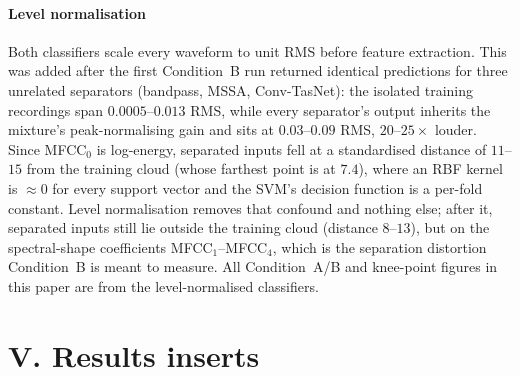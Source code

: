 \documentclass[conference]{IEEEtran}
\begin{document}
\paragraph{Level normalisation}
Both classifiers scale every waveform to unit RMS before feature extraction. This was added after the first Condition~B run returned identical predictions for three unrelated separators (bandpass, MSSA, Conv-TasNet): the isolated training recordings span $0.0005$--$0.013$ RMS, while every separator's output inherits the mixture's peak-normalising gain and sits at $0.03$--$0.09$ RMS, $20$--$25\times$ louder. Since MFCC$_0$ is log-energy, separated inputs fell at a standardised distance of $11$--$15$ from the training cloud (whose farthest point is at $7.4$), where an RBF kernel is $\approx 0$ for every support vector and the SVM's decision function is a per-fold constant. Level normalisation removes that confound and nothing else; after it, separated inputs still lie outside the training cloud (distance $8$--$13$), but on the spectral-shape coefficients MFCC$_1$--MFCC$_4$, which is the separation distortion Condition~B is meant to measure. All Condition~A/B and knee-point figures in this paper are from the level-normalised classifiers.

\section*{V. Results inserts}
\end{document}
